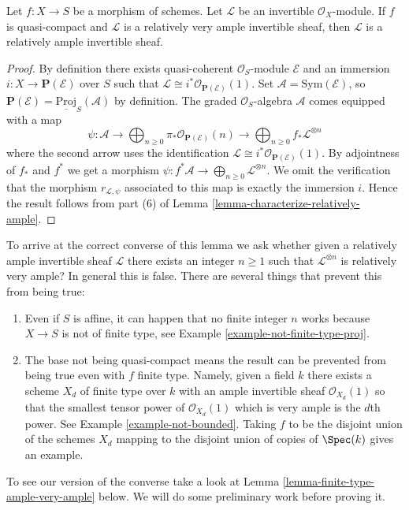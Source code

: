 \begin{lemma}
\label{lemma-ample-very-ample}
Let $f : X \to S$ be a morphism of schemes.
Let $\mathcal{L}$ be an invertible $\mathcal{O}_X$-module.
If $f$ is quasi-compact and $\mathcal{L}$ is a relatively
very ample invertible sheaf, then $\mathcal{L}$ is a relatively
ample invertible sheaf.
\end{lemma}

\begin{proof}
By definition there exists quasi-coherent $\mathcal{O}_S$-module
$\mathcal{E}$ and an immersion $i : X \to \mathbf{P}(\mathcal{E})$
over $S$ such that
$\mathcal{L} \cong i^*\mathcal{O}_{\mathbf{P}(\mathcal{E})}(1)$.
Set $\mathcal{A} = \text{Sym}(\mathcal{E})$, so
$\mathbf{P}(\mathcal{E}) = \underline{\text{Proj}}_S(\mathcal{A})$
by definition. The graded $\mathcal{O}_S$-algebra $\mathcal{A}$
comes equipped with a map
$$
\psi :
\mathcal{A} \to
\bigoplus\nolimits_{n \geq 0}
\pi_*\mathcal{O}_{\mathbf{P}(\mathcal{E})}(n) \to
\bigoplus\nolimits_{n \geq 0}
f_*\mathcal{L}^{\otimes n}
$$
where the second arrow uses the identification
$\mathcal{L} \cong i^*\mathcal{O}_{\mathbf{P}(\mathcal{E})}(1)$.
By adjointness of $f_*$ and $f^*$ we get a morphism
$\psi : f^*\mathcal{A} \to \bigoplus_{n \geq 0}\mathcal{L}^{\otimes n}$.
We omit the verification that the morphism $r_{\mathcal{L}, \psi}$
associated to this map is exactly the immersion $i$.
Hence the result follows from
part (6) of Lemma \ref{lemma-characterize-relatively-ample}.
\end{proof}

\noindent
To arrive at the correct converse of this lemma we ask
whether given a relatively ample
invertible sheaf $\mathcal{L}$ there exists an integer $n \geq 1$ such
that $\mathcal{L}^{\otimes n}$ is relatively very ample? In general this
is false. There are several things that prevent this from being true:
\begin{enumerate}
\item Even if $S$ is affine, it can happen that no finite integer
$n$ works because $X \to S$ is not of finite type, see
Example \ref{example-not-finite-type-proj}.
\item The base not being quasi-compact means the result can be
prevented from being true even with $f$ finite type. Namely, given
a field $k$ there exists a scheme $X_d$ of finite type over $k$ with
an ample invertible sheaf $\mathcal{O}_{X_d}(1)$ so that the smallest
tensor power of $\mathcal{O}_{X_d}(1)$ which is very ample is the $d$th
power. See Example \ref{example-not-bounded}.
Taking $f$ to be the disjoint union of the schemes $X_d$ mapping
to the disjoint union of copies of $\Spec(k)$ gives an example.
\end{enumerate}
To see our version of the converse take a look at
Lemma \ref{lemma-finite-type-ample-very-ample} below.
We will do some preliminary work before proving it.

